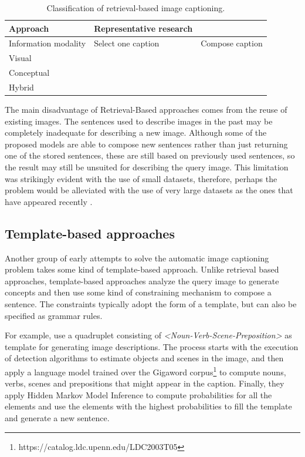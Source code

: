 \begin{table}[ht]
\centering
\caption{Classification of retrieval-based image captioning.}
\begin{tabular}[t]{p{}p{}p{}}
    \toprule
    Approach & Representative research\\
    \midrule
    Information modality & Select one caption & Compose caption \\
    Visual & \citet{Farhadi2010, Mason2015} & \cite{Gupta2012} \\
    Conceptual &  \cite{Ordonez2011} & \citet{Kuznetsova2012, Kuznetsova2014} \\
    Hybrid &  \citet{Hodosh2013b} & \\
    \bottomrule
\end{tabular}
\label{tab:retrieval_classification}
\end{table}

The main disadvantage of Retrieval-Based approaches comes from the reuse of existing images. The sentences used to describe images in the past may be completely inadequate for describing a new image. Although some of the proposed models are able to compose new sentences rather than just returning one of the stored sentences, these are still based on previously used sentences, so the result may still be unsuited for describing the query image. This limitation was strikingly evident with the use of small datasets, therefore, perhaps the problem would be alleviated with the use of very large datasets as the ones that have appeared recently \citet{Lin2014, Sharma2018}.

\subsection{Template-based approaches}\label{subsec:template-based_methods}

Another group of early attempts to solve the automatic image captioning problem takes some kind of template-based approach. Unlike retrieval based approaches, template-based approaches analyze the query image to generate concepts and then use some kind of constraining mechanism to compose a sentence. The constraints typically adopt the form of a template, but can also be specified as grammar rules.

For example, \citet{Yang2011} use a quadruplet consisting of \textit{<Noun-Verb-Scene-Preposition>} as template for generating image descriptions. The process starts with the execution of detection algorithms to estimate objects and scenes in the image, and then apply a language model trained over the Gigaword corpus\footnote{https://catalog.ldc.upenn.edu/LDC2003T05} to compute nouns, verbs, scenes and prepositions that might appear in the caption. Finally, they apply Hidden Markov Model Inference to compute probabilities for all the elements and use the elements with the highest probabilities to fill the template and generate a new sentence.

